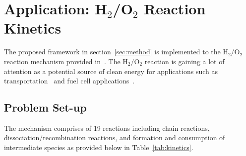 \section{Application: H$_2$/O$_2$ Reaction Kinetics}
\label{sec:app}

%
%

The proposed framework in section~\ref{sec:method} is implemented to 
the H$_2$/O$_2$ reaction mechanism provided in~\cite{Yetter:1991}.
The H$_2$/O$_2$ reaction is gaining a lot of attention as a potential
source of clean energy for applications such as 
transportation~\cite{Das:1996} and fuel cell 
applications~\cite{Loges:2008,Cosnier:2016}. 

\subsection{Problem Set-up}
\label{sub:setup}  
The mechanism comprises of 19 reactions including chain reactions,
dissociation/recombination reactions, and formation and consumption
of intermediate species as provided below in Table~\ref{tab:kinetics}.

